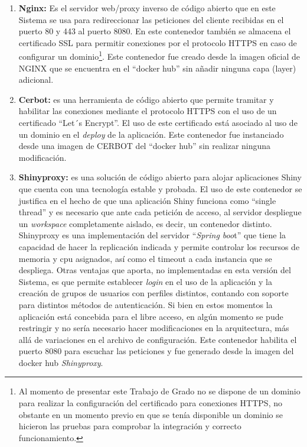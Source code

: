 \documentclass[
  12pt,
  openany]{book}
\begin{document}
\begin{enumerate}
\def\labelenumi{\arabic{enumi}.}
\item
  \textbf{Nginx:} Es el servidor web/proxy inverso de código abierto que en este Sistema se usa para redireccionar las peticiones del cliente recibidas en el puerto 80 y 443 al puerto 8080. En este contenedor también se almacena el certificado SSL para permitir conexiones por el protocolo HTTPS en caso de configurar un dominio\footnote{Al momento de presentar este Trabajo de Grado no se dispone de un dominio para realizar la configuración del certificado para conexiones HTTPS, no obstante en un momento previo en que se tenía disponible un dominio se hicieron las pruebas para comprobar la integración y correcto funcionamiento.}. Este contenedor fue creado desde la imagen oficial de NGINX que se encuentra en el ``docker hub'' sin añadir ninguna capa (layer) adicional.
\item
  \textbf{Cerbot:} es una herramienta de código abierto que permite tramitar y habilitar las conexiones mediante el protocolo HTTPS con el uso de un certificado ``Let´s Encrypt''. El uso de este certificado está asociado al uso de un dominio en el \emph{deploy} de la aplicación. Este contenedor fue instanciado desde una imagen de CERBOT del ``docker hub'' sin realizar ninguna modificación.
\item
  \textbf{Shinyproxy:} es una solución de código abierto para alojar aplicaciones Shiny \citep{shinyproxy2023} que cuenta con una tecnología estable y probada. El uso de este contenedor se justifica en el hecho de que una aplicación Shiny funciona como ``single thread'' y es necesario que ante cada petición de acceso, al servidor despliegue un \emph{workspace} completamente aislado, es decir, un contenedor distinto. Shinyproxy es una implementación del servidor ``\emph{Spring boo}t'' que tiene la capacidad de hacer la replicación indicada y permite controlar los recursos de memoria y cpu asignados, así como el timeout a cada instancia que se despliega. Otras ventajas que aporta, no implementadas en esta versión del Sistema, es que permite establecer \emph{login} en el uso de la aplicación y la creación de grupos de usuarios con perfiles distintos, contando con soporte para distintos métodos de autenticación. Si bien en estos momentos la aplicación está concebida para el libre acceso, en algún momento se pude restringir y no sería necesario hacer modificaciones en la arquitectura, más allá de variaciones en el archivo de configuración. Este contenedor habilita el puerto 8080 para escuchar las peticiones y fue generado desde la imagen del docker hub \emph{Shinyproxy}.

\end{enumerate}
\end{document}
